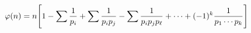 \documentclass[preview]{standalone}
\begin{document}
\begin{align*}
\special{dvisvgm:raw <g id='unique000'>}\varphi(n)=n\Bigg[1-\sum\frac{1}{p_i}+\sum\frac{1}{p_i p_j}-\sum\frac{1}{p_i p_j p_\ell}+\cdots+(-1)^k\frac{1}{p_1\cdots p_k}\Bigg]\special{dvisvgm:raw </g>}
\end{align*}
\end{document}
